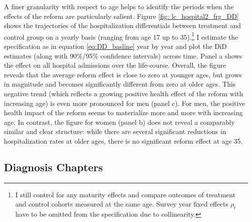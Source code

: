 \documentclass[11pt, a4paper]{article} %
\begin{document}
A finer granularity with respect to age helps to identify the periods when the effects of the reform are particularly salient. Figure \ref{fig: lc_hospital2_frg_DD} shows the trajectories of the hospitalization differentials between treatment and control group on a yearly basis (ranging from age 17 up to 35).\footnote{I still control for any maturity effects and compare outcomes of treatment and control cohorts measured at the same age. Survey year fixed effects $\rho_t$ have to be omitted from the specification due to collinearity.} I estimate the specification as in equation \ref{eq:DD_basline} year by year and plot the DiD estimates (along with 90\%/95\% confidence intervals) across time. Panel a shows the effect on all hospital admissions over the life-course. Overall, the figure reveals that the average reform effect is close to zero at younger ages, but grows in magnitude and becomes significantly different from zero at older ages. This negative trend (which reflects a growing positive health effect of the reform with increasing age) is even more pronounced for men (panel c). For men, the positive health impact of the reform seems to materialize more and more with increasing age. In contrast, the figure for women (panel b) does not reveal a comparably similar and clear structure: while there are several significant reductions in hospitalization rates at older ages, there is no significant reform effect at age 35.\newline




\subsection{Diagnosis Chapters}
\end{document}
